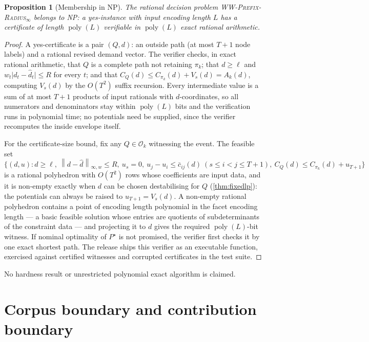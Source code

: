 \documentclass[11pt]{article}
\newtheorem{proposition}[theorem]{Proposition}
\theoremstyle{definition}
\newcommand{\cO}{\mathcal{O}}
\newcommand{\winf}[1]{\left\lVert #1\right\rVert_{\infty,w}}
\newcommand{\WWR}{\textsc{WW-Prefix-Radius}\ensuremath{_{\infty}}}
\newcommand{\dhat}{\widehat d}
\newcommand{\ellv}{\ell}
\begin{document}
\begin{proposition}[Membership in NP]\label{prop:np}
The rational decision problem \WWR{} belongs to NP: a yes-instance with
input encoding length $L$ has a certificate of length
$\operatorname{poly}(L)$ verifiable in $\operatorname{poly}(L)$ exact
rational arithmetic.
\end{proposition}

\begin{proof}
A yes-certificate is a pair $(Q,d)$: an outside path (at most $T+1$ node
labels) and a rational revised demand vector. The verifier checks, in
exact rational arithmetic, that $Q$ is a complete path not retaining
$\pi_k$; that $d\ge\ellv$ and $w_t\lvert d_t-\dhat_t\rvert\le R$ for
every $t$; and that $C_Q(d)\le C_{\pi_k}(d)+V_{s}(d)=A_k(d)$, computing
$V_s(d)$ by the $O(T^2)$ suffix recursion. Every intermediate value is a
sum of at most $T+1$ products of input rationals with $d$-coordinates, so
all numerators and denominators stay within $\operatorname{poly}(L)$ bits
and the verification runs in polynomial time; no potentials need be
supplied, since the verifier recomputes the inside envelope itself.

For the certificate-size bound, fix any $Q\in\cO_k$ witnessing the event.
The feasible set
$\{(d,u):d\ge\ellv,\ \winf{d-\dhat}\le R,\ u_s=0,\
u_j-u_i\le\bar c_{ij}(d)\ (s\le i<j\le T+1),\
C_Q(d)\le C_{\pi_k}(d)+u_{T+1}\}$
is a rational polyhedron with $O(T^2)$ rows whose coefficients are input
data, and it is non-empty exactly when $d$ can be chosen destabilising
for $Q$ (\cref{thm:fixedlp}): the potentials can always be raised to
$u_{T+1}=V_s(d)$. A non-empty rational polyhedron contains a point of
encoding length polynomial in the facet encoding length --- a basic
feasible solution whose entries are quotients of subdeterminants of the
constraint data \parencite[Cor.~10.2]{Schrijver1986} --- and projecting
it to $d$ gives the required $\operatorname{poly}(L)$-bit witness. If
nominal optimality of $P^\star$ is not promised, the verifier first
checks it by one exact shortest path. The release ships this verifier as
an executable function, exercised against certified witnesses and
corrupted certificates in the test suite.
\end{proof}

No hardness result or unrestricted polynomial exact algorithm is claimed.

\section{Corpus boundary and contribution boundary}\label{sec:literature}
\end{document}
